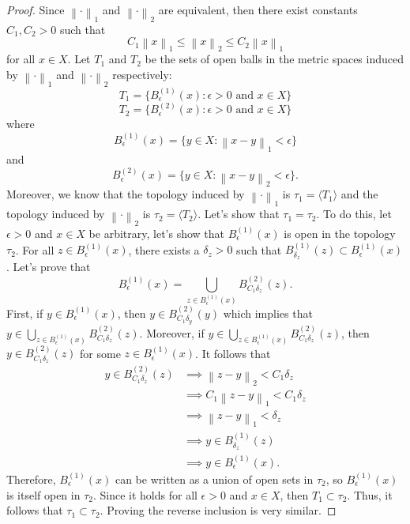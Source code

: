 \documentclass[12pt]{article}
\newcommand{\lnorm}[2]{\left\lVert#2 \right\rVert_{#1}}
\begin{document}
\begin{proof}
    Since $\lnorm{1}{\cdot}$ and $\lnorm{2}{\cdot}$ are equivalent, then there exist constants $C_1, C_2 > 0$ such that
    $$C_1 \lnorm{1}{x} \leq \lnorm{2}{x} \leq C_2 \lnorm{1}{x}$$
    for all $x \in X$. Let $T_1$ and $T_2$ be the sets of open balls in the metric spaces induced by $\lnorm{1}{\cdot}$ and $\lnorm{2}{\cdot}$ respectively:
    $$T_1 = \{B_{\epsilon}^{(1)}(x) : \epsilon > 0 \text{ and } x\in X\}$$
    $$T_2 = \{B_{\epsilon}^{(2)}(x) : \epsilon > 0 \text{ and } x\in X\}$$
    where 
    $$B_{\epsilon}^{(1)}(x) = \{y \in X : \lnorm{1}{x - y} < \epsilon\}$$
    and 
    $$B_{\epsilon}^{(2)}(x) = \{y \in X : \lnorm{2}{x - y} < \epsilon\}.$$
    Moreover, we know that the topology induced by $\lnorm{1}{\cdot}$ is $\tau_1 = \langle T_1 \rangle$ and the topology induced by $\lnorm{2}{\cdot}$ is $\tau_2 = \langle T_2 \rangle$. Let's show that $\tau_1 = \tau_2$. To do this, let $\epsilon > 0$ and $x \in X$ be arbitrary, let's show that $B_{\epsilon}^{(1)}(x)$ is open in the topology $\tau_2$. For all $z \in B_{\epsilon}^{(1)}(x)$, there exists a $\delta_z > 0$ such that $B_{\delta_z}^{(1)}(z) \subset B_{\epsilon}^{(1)}(x)$. Let's prove that
    $$B_{\epsilon}^{(1)}(x) = \bigcup_{z \in  B_{\epsilon}^{(1)}(x)}B_{C_1\delta_z}^{(2)}(z).$$
    First, if $y \in B_{\epsilon}^{(1)}(x)$, then $y \in B_{C_1\delta_y}^{(2)}(y)$ which implies that $y \in \bigcup_{z \in  B_{\epsilon}^{(1)}(x)}B_{C_1\delta_z}^{(2)}(z)$. Moreover, if $y \in \bigcup_{z \in  B_{\epsilon}^{(1)}(x)}B_{C_1\delta_z}^{(2)}(z)$, then $y \in B_{C_1\delta_z}^{(2)}(z)$ for some $z \in B_{\epsilon}^{(1)}(x)$. It follows that
    \begin{align*}
        y \in B_{C_1\delta_z}^{(2)}(z) &\implies \lnorm{2}{z - y} < C_1 \delta_z \\
        &\implies C_1 \lnorm{1}{z - y} < C_1 \delta_z \\
        &\implies \lnorm{1}{z - y} < \delta_z \\
        &\implies y \in B_{\delta_z}^{(1)}(z) \\
        &\implies y \in B_{\epsilon}^{(1)}(x). 
    \end{align*}
    Therefore, $B_{\epsilon}^{(1)}(x)$ can be written as a union of open sets in $\tau_2$, so $B_{\epsilon}^{(1)}(x)$ is itself open in $\tau_2$. Since it holds for all $\epsilon > 0$ and $x \in X$, then $T_1 \subset \tau_2$. Thus, it follows that $\tau_1 \subset \tau_2$. Proving the reverse inclusion is very similar.
\end{proof}
\end{document}
